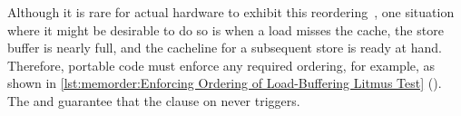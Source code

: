 \begin{listing}

\caption{Enforcing Ordering of Load-Buffering Litmus Test}
\label{lst:memorder:Enforcing Ordering of Load-Buffering Litmus Test}
\end{listing}

\begin{fcvref}
Although it is rare for actual hardware to
exhibit this reordering~\cite{LucMaranget2017aarch64},
one situation where it might be desirable to do so is when a load
misses the cache, the store buffer is nearly full, and the cacheline for
a subsequent store is ready at hand.
Therefore, portable code must enforce any required ordering, for example,
as shown in
\cref{lst:memorder:Enforcing Ordering of Load-Buffering Litmus Test}
().
The  and  guarantee that
the  clause on  never triggers.
\end{fcvref}

